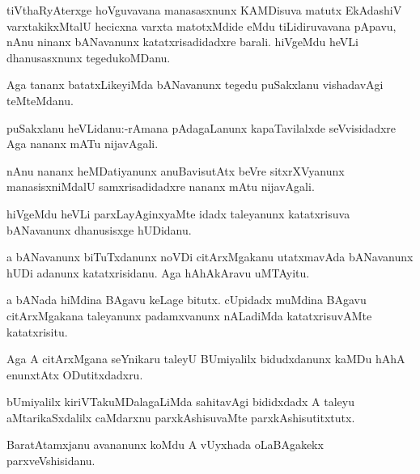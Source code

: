 \documentclass{article}
\begin{document}
\begin{mn}%
tiVthaRyAterxge hoVguvavana manasasxnunx KAMDisuva matutx EkAdashiV varxtakikxMtalU hecicxna 
varxta matotxMdide eMdu tiLidiruvavana pApavu, nAnu ninanx bANavanunx katatxrisadidadxre 
barali. hiVgeMdu heVLi dhanusasxnunx tegedukoMDanu.
\end{mn}

\begin{mn}%
Aga tananx batatxLikeyiMda bANavanunx tegedu puSakxlanu vishadavAgi teMteMdanu.
\end{mn}

\begin{mn}%
puSakxlanu heVLidanu:-rAmana pAdagaLanunx kapaTavilalxde seVvisidadxre Aga nananx mATu 
nijavAgali.
\end{mn}

\begin{mn}%
nAnu nananx heMDatiyanunx anuBavisutAtx beVre sitxrXVyanunx manasisxniMdalU 
samxrisadidadxre nananx mAtu nijavAgali.
\end{mn}

\begin{mn}%
hiVgeMdu heVLi parxLayAginxyaMte idadx taleyanunx katatxrisuva bANavanunx dhanusisxge 
hUDidanu.
\end{mn}

\begin{mn}%
a bANavanunx biTuTxdanunx noVDi citArxMgakanu utatxmavAda bANavanunx hUDi adanunx 
katatxrisidanu. Aga hAhAkAravu uMTAyitu.
\end{mn}

\begin{mn}%
a bANada hiMdina BAgavu keLage bitutx. cUpidadx muMdina BAgavu citArxMgakana taleyanunx 
padamxvanunx nALadiMda katatxrisuvAMte katatxrisitu.
\end{mn}

\begin{mn}%
Aga A citArxMgana seYnikaru taleyU BUmiyalilx bidudxdanunx kaMDu hAhA enunxtAtx 
ODutitxdadxru.
\end{mn}

\begin{mn}%
bUmiyalilx kiriVTakuMDalagaLiMda sahitavAgi bididxdadx A taleyu aMtarikaSxdalilx caMdarxnu 
parxkAshisuvaMte parxkAshisutitxtutx.
\end{mn}

\begin{mn}%
BaratAtamxjanu avananunx koMdu A vUyxhada oLaBAgakekx parxveVshisidanu.
\end{mn}
\end{document}
